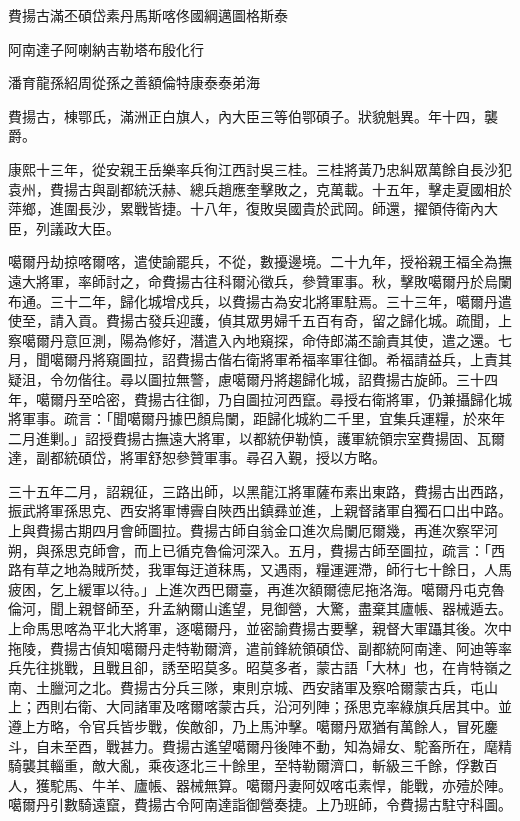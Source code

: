 
\begin{pinyinscope}
費揚古滿丕碩岱素丹馬斯喀佟國綱邁圖格斯泰

阿南達子阿喇納吉勒塔布殷化行

潘育龍孫紹周從孫之善額倫特康泰泰弟海

費揚古，棟鄂氏，滿洲正白旗人，內大臣三等伯鄂碩子。狀貌魁異。年十四，襲爵。

康熙十三年，從安親王岳樂率兵徇江西討吳三桂。三桂將黃乃忠糾眾萬餘自長沙犯袁州，費揚古與副都統沃赫、總兵趙應奎擊敗之，克萬載。十五年，擊走夏國相於萍鄉，進圍長沙，累戰皆捷。十八年，復敗吳國貴於武岡。師還，擢領侍衛內大臣，列議政大臣。

噶爾丹劫掠喀爾喀，遣使諭罷兵，不從，數擾邊境。二十九年，授裕親王福全為撫遠大將軍，率師討之，命費揚古往科爾沁徵兵，參贊軍事。秋，擊敗噶爾丹於烏闌布通。三十二年，歸化城增戍兵，以費揚古為安北將軍駐焉。三十三年，噶爾丹遣使至，請入貢。費揚古發兵迎護，偵其眾男婦千五百有奇，留之歸化城。疏聞，上察噶爾丹意叵測，陽為修好，潛遣入內地窺探，命侍郎滿丕諭責其使，遣之還。七月，聞噶爾丹將窺圖拉，詔費揚古偕右衛將軍希福率軍往御。希福請益兵，上責其疑沮，令勿偕往。尋以圖拉無警，慮噶爾丹將趨歸化城，詔費揚古旋師。三十四年，噶爾丹至哈密，費揚古往御，乃自圖拉河西竄。尋授右衛將軍，仍兼攝歸化城將軍事。疏言：「聞噶爾丹據巴顏烏闌，距歸化城約二千里，宜集兵運糧，於來年二月進剿。」詔授費揚古撫遠大將軍，以都統伊勒慎，護軍統領宗室費揚固、瓦爾達，副都統碩岱，將軍舒恕參贊軍事。尋召入覲，授以方略。

三十五年二月，詔親征，三路出師，以黑龍江將軍薩布素出東路，費揚古出西路，振武將軍孫思克、西安將軍博霽自陜西出鎮彞並進，上親督諸軍自獨石口出中路。上與費揚古期四月會師圖拉。費揚古師自翁金口進次烏闌厄爾幾，再進次察罕河朔，與孫思克師會，而上已循克魯倫河深入。五月，費揚古師至圖拉，疏言：「西路有草之地為賊所焚，我軍每迂道秣馬，又遇雨，糧運遲滯，師行七十餘日，人馬疲困，乞上緩軍以待。」上進次西巴爾臺，再進次額爾德尼拖洛海。噶爾丹屯克魯倫河，聞上親督師至，升孟納爾山遙望，見御營，大驚，盡棄其廬帳、器械遁去。上命馬思喀為平北大將軍，逐噶爾丹，並密諭費揚古要擊，親督大軍躡其後。次中拖陵，費揚古偵知噶爾丹走特勒爾濟，遣前鋒統領碩岱、副都統阿南達、阿迪等率兵先往挑戰，且戰且卻，誘至昭莫多。昭莫多者，蒙古語「大林」也，在肯特嶺之南、土臘河之北。費揚古分兵三隊，東則京城、西安諸軍及察哈爾蒙古兵，屯山上；西則右衛、大同諸軍及喀爾喀蒙古兵，沿河列陣；孫思克率綠旗兵居其中。並遵上方略，令官兵皆步戰，俟敵卻，乃上馬沖擊。噶爾丹眾猶有萬餘人，冒死鏖斗，自未至酉，戰甚力。費揚古遙望噶爾丹後陣不動，知為婦女、駝畜所在，麾精騎襲其輜重，敵大亂，乘夜逐北三十餘里，至特勒爾濟口，斬級三千餘，俘數百人，獲駝馬、牛羊、廬帳、器械無算。噶爾丹妻阿奴喀屯素悍，能戰，亦殪於陣。噶爾丹引數騎遠竄，費揚古令阿南達詣御營奏捷。上乃班師，令費揚古駐守科圖。


\end{pinyinscope}
